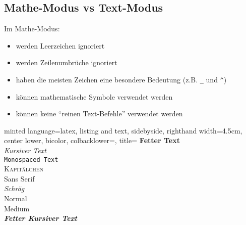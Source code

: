 \documentclass[
    ngerman,
    accentcolor=3b,
    dark_mode,
    fontsize= 12pt,
    a4paper,
    aspectratio=169,
    colorback=true,
    fancy_row_colors,
    leqno,
    fleqn,
    boxarc=3pt,
    fleqn,
]{algoslides}
\begin{document}
    \subsection{Mathe-Modus vs Text-Modus}
    \begin{frame}[c,fragile]
        \slidehead{}
        Im Mathe-Modus:
        \begin{itemize}
            \item werden Leerzeichen ignoriert
            \item werden Zeilenumbrüche ignoriert
            \item haben die meisten Zeichen eine besondere Bedeutung (z.B. \verb|_| und \verb|^|)
            \item können mathematische Symbole verwendet werden
            \item können keine \enquote{reinen Text-Befehle} verwendet werden
        \end{itemize}
    \end{frame}

    \begin{frame}[c, fragile]
        \slidehead{}
        \begin{codeBlock}[]{
            minted language=latex,
            listing and text,
            sidebyside,
            righthand width=4.5cm,
            center lower,
            bicolor,
            colbacklower=,
            title=
            }
            \textbf{Fetter Text}\\
            \textit{Kursiver Text}\\
            \texttt{Monospaced Text}\\
            \textsc{Kapitälchen}\\
            \textsf{Sans Serif}\\
            \textsl{Schräg}\\
            \textup{Normal}\\
            \textmd{Medium}\\
            \textbf{\textit{Fetter Kursiver Text}}
        \end{codeBlock}
    \end{frame}
\end{document}
